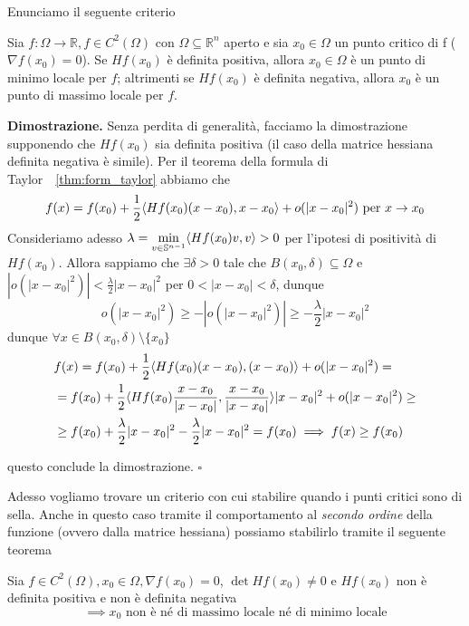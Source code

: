 Enunciamo il seguente criterio

\vspace{0.5cm}
\begin{theorem}[\textcolor{blue}{condizione sufficiente per il massimo/minimo locale}]
Sia $f:\Omega \to \mathbb{R}, f \in C^2 (\Omega)$ con $\Omega \subseteq \mathbb{R}^n$ aperto e sia $x_0 \in \Omega$ un punto critico di f ($\nabla f(x_0) = 0$). Se $Hf(x_0)$ è definita positiva, allora $x_0 \in \Omega$ è un punto di minimo locale per $f$; altrimenti se $Hf(x_0)$ è definita negativa, allora $x_0$ è un punto di massimo locale per $f$.
\end{theorem}

\noindent \textbf{Dimostrazione. }
Senza perdita di generalità, facciamo la dimostrazione supponendo che $Hf(x_0)$ sia definita positiva (il caso della matrice hessiana definita negativa è simile). 
Per il teorema della formula di Taylor~~\ref{thm:form_taylor} abbiamo che
$$
f(x) = f(x_0) + \frac{1}{2} \langle Hf(x_0)(x-x_0), x-x_0 \rangle + o(|x-x_0|^2) \text{ per } x \to x_0
$$
Consideriamo adesso $\lambda = \min\limits_{v \in \mathbb{S}^{n-1}} \langle Hf(x_0)v, v \rangle > 0$ per l'ipotesi di positività di $Hf(x_0)$. Allora sappiamo che $\exists \delta > 0$ tale che $B(x_0, \delta) \subseteq \Omega$ e $|o(|x-x_0|^2)| < \frac{\lambda}{2}|x-x_0|^2$ per $0 < |x-x_0| < \delta$, dunque
$$
o(|x-x_0|^2) \geq -|o(|x-x_0|^2)| \geq -\frac{\lambda}{2}|x-x_0|^2
$$
dunque $\forall x \in B(x_0, \delta) \setminus \{ x_0 \}$
\[\begin{aligned}
&f(x) = f(x_0) + \frac{1}{2}\langle Hf(x_0)(x-x_0), (x-x_0) \rangle + o(|x-x_0|^2) = \\
&=f(x_0) + \frac{1}{2} \langle Hf(x_0)\frac{x-x_0}{|x-x_0|}, \frac{x-x_0}{|x-x_0|} \rangle|x-x_0|^2 + o(|x-x_0|^2) \geq \\
&\geq f(x_0) + \frac{\lambda}{2}|x-x_0|^2 - \frac{\lambda}{2}|x-x_0|^2 = f(x_0) \implies f(x) \geq f(x_0)
\end{aligned}\]

questo conclude la dimostrazione.
\hfill $\square$

Adesso vogliamo trovare un criterio con cui stabilire quando i punti critici sono di sella. Anche in questo caso tramite il comportamento al \emph{secondo ordine} della funzione (ovvero dalla matrice hessiana) possiamo stabilirlo tramite il seguente teorema

\vspace{0.5cm}
\begin{theorem}[\textcolor{blue}{dei punti di sella}]
Sia $f \in C^2(\Omega), x_0 \in \Omega, \nabla f(x_0) = 0$, $\det{Hf(x_0)} \neq 0$ e $Hf(x_0)$ non è definita positiva e non è definita negativa
$$
\implies x_0 \text{ non è né di massimo locale né di minimo locale}
$$
\end{theorem}

